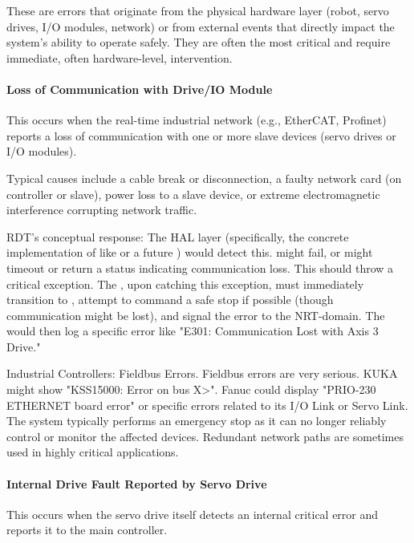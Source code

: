 These are errors that originate from the physical hardware layer (robot, servo drives, I/O modules, network) or from external events that directly impact the system's ability to operate safely. They are often the most critical and require immediate, often hardware-level, intervention.

\paragraph{Loss of Communication with Drive/IO Module}
This occurs when the real-time industrial network (e.g., EtherCAT, Profinet) reports a loss of communication with one or more slave devices (servo drives or I/O modules).

Typical causes include a cable break or disconnection, a faulty network card (on controller or slave), power loss to a slave device, or extreme electromagnetic interference corrupting network traffic.

RDT's conceptual response: The HAL layer (specifically, the concrete implementation of  like  or a future ) would detect this.  might fail, or  might timeout or return a status indicating communication loss. This should throw a critical exception. The , upon catching this exception, must immediately transition to , attempt to command a safe stop if possible (though communication might be lost), and signal the error to the NRT-domain. The  would then log a specific error like "E301: Communication Lost with Axis 3 Drive."

\begin{principlebox}{Industrial Controllers: Fieldbus Errors.}
    Fieldbus errors are very serious. KUKA might show "KSS15000: Error on bus \<X>". Fanuc could display "PRIO-230 ETHERNET board error" or specific errors related to its I/O Link or Servo Link. The system typically performs an emergency stop as it can no longer reliably control or monitor the affected devices. Redundant network paths are sometimes used in highly critical applications.
\end{principlebox}

\paragraph{Internal Drive Fault Reported by Servo Drive}
This occurs when the servo drive itself detects an internal critical error and reports it to the main controller.

